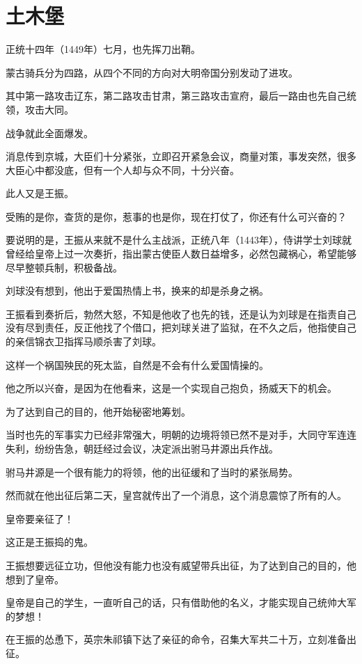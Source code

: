 \section{土木堡}
\ifnum{}
	\begin{multicols}{\theparacolNo}
\fi
正统十四年（1449年）七月，也先挥刀出鞘。

蒙古骑兵分为四路，从四个不同的方向对大明帝国分别发动了进攻。

其中第一路攻击辽东，第二路攻击甘肃，第三路攻击宣府，最后一路由也先自己统领，攻击大同。

战争就此全面爆发。

消息传到京城，大臣们十分紧张，立即召开紧急会议，商量对策，事发突然，很多大臣心中都没底，但有一个人却与众不同，十分兴奋。

此人又是王振。

受贿的是你，查货的是你，惹事的也是你，现在打仗了，你还有什么可兴奋的？

要说明的是，王振从来就不是什么主战派，正统八年（1443年），侍讲学士刘球就曾经给皇帝上过一次奏折，指出蒙古使臣人数日益增多，必然包藏祸心，希望能够尽早整顿兵制，积极备战。

刘球没有想到，他出于爱国热情上书，换来的却是杀身之祸。

王振看到奏折后，勃然大怒，不知是他收了也先的钱，还是认为刘球是在指责自己没有尽到责任，反正他找了个借口，把刘球关进了监狱，在不久之后，他指使自己的亲信锦衣卫指挥马顺杀害了刘球。

这样一个祸国殃民的死太监，自然是不会有什么爱国情操的。

他之所以兴奋，是因为在他看来，这是一个实现自己抱负，扬威天下的机会。

为了达到自己的目的，他开始秘密地筹划。

当时也先的军事实力已经非常强大，明朝的边境将领已然不是对手，大同守军连连失利，纷纷告急，朝廷经过会议，决定派出驸马井源出兵作战。

驸马井源是一个很有能力的将领，他的出征缓和了当时的紧张局势。

然而就在他出征后第二天，皇宫就传出了一个消息，这个消息震惊了所有的人。

皇帝要亲征了！

这正是王振捣的鬼。

王振想要远征立功，但他没有能力也没有威望带兵出征，为了达到自己的目的，他想到了皇帝。

皇帝是自己的学生，一直听自己的话，只有借助他的名义，才能实现自己统帅大军的梦想！

在王振的怂恿下，英宗朱祁镇下达了亲征的命令，召集大军共二十万，立刻准备出征。


\end{multicols}
